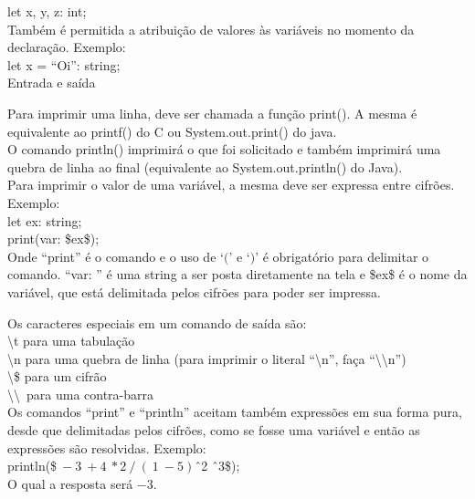 \documentclass[12pt,a4paper]{article}
\begin{document}
let x, y, z: int;\\

Também é permitida a atribuição de valores às variáveis no momento da declaração. Exemplo:\\

let x = ``Oi'': string;\\

\hypertarget{label1}{\Large{Entrada e saída}}\\[0.3cm]
\normalsize

Para imprimir uma linha, deve ser chamada a função print(). A mesma é equivalente ao printf() do C ou System.out.print() do java.\\
O comando println() imprimirá o que foi solicitado e também imprimirá uma quebra de linha ao final (equivalente ao System.out.println() do Java).\\

Para imprimir o valor de uma variável, a mesma deve ser expressa entre cifrões. Exemplo: \\

let ex: string;\\

print(var: \$ex\$); \\

Onde ``print'' é o comando e o uso de `$($' e `$)$' é obrigatório para delimitar o comando. ``var: '' é uma string a ser posta diretamente na tela e \$ex\$ é o nome da variável, que está delimitada pelos cifrões para poder ser impressa.

Os caracteres especiais em um comando de saída são:\\[0.2cm]
\textbackslash t para uma tabulação \\
\textbackslash n para uma quebra de linha (para imprimir o literal ``\textbackslash n'', faça ``\textbackslash \textbackslash n'')\\
\textbackslash \$ para um cifrão \\
\textbackslash \textbackslash\ para uma contra-barra \\

Os comandos ``print'' e ``println'' aceitam também expressões em sua forma pura, desde que delimitadas pelos cifrões, como se fosse uma variável e então as expressões são resolvidas. Exemplo: \\

println(\$$\ -3\ +4\ *2\ /\ (\ 1\ - 5)$\^\ 2 \^\ 3\$);\\

O qual a resposta será $-3$.\\
\end{document}
